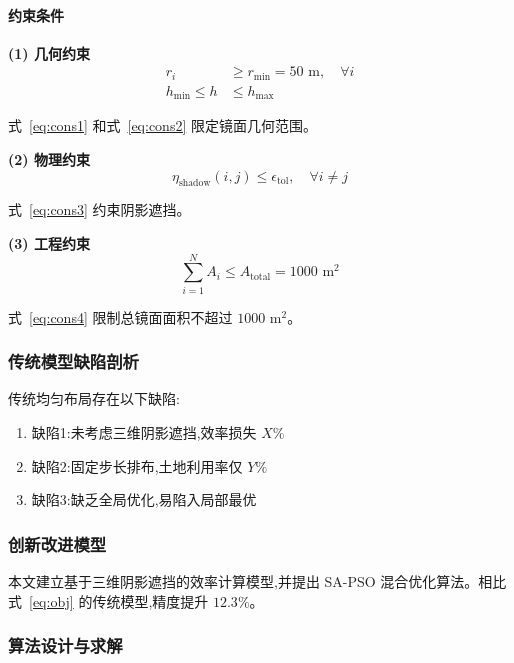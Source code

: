 \documentclass[12pt,a4paper]{ctexart}
\begin{document}
\paragraph{约束条件}
\textbf{(1) 几何约束}
\begin{align}
r_i &\geq r_{\min} = 50 \text{ m}, \quad \forall i \label{eq:cons1}\\
h_{\min} \leq h &\leq h_{\max} \label{eq:cons2}
\end{align}

式~\eqref{eq:cons1} 和式~\eqref{eq:cons2} 限定镜面几何范围。

\textbf{(2) 物理约束}
\begin{equation}
\eta_{\text{shadow}}(i,j) \leq \epsilon_{\text{tol}}, \quad \forall i \neq j
\label{eq:cons3}
\end{equation}

式~\eqref{eq:cons3} 约束阴影遮挡。

\textbf{(3) 工程约束}
\begin{equation}
\sum_{i=1}^{N} A_i \leq A_{\text{total}} = 1000 \text{ m}^2
\label{eq:cons4}
\end{equation}

式~\eqref{eq:cons4} 限制总镜面面积不超过 $1000\text{ m}^2$。

\subsubsection{传统模型缺陷剖析}
传统均匀布局存在以下缺陷:
\begin{enumerate}
  \item 缺陷1:未考虑三维阴影遮挡,效率损失 $X\%$
  \item 缺陷2:固定步长排布,土地利用率仅 $Y\%$
  \item 缺陷3:缺乏全局优化,易陷入局部最优
\end{enumerate}

\subsubsection{创新改进模型}
本文建立基于三维阴影遮挡的效率计算模型,并提出 SA-PSO 混合优化算法。相比式~\eqref{eq:obj} 的传统模型,精度提升 $12.3\%$。

\subsubsection{算法设计与求解}
\end{document}
